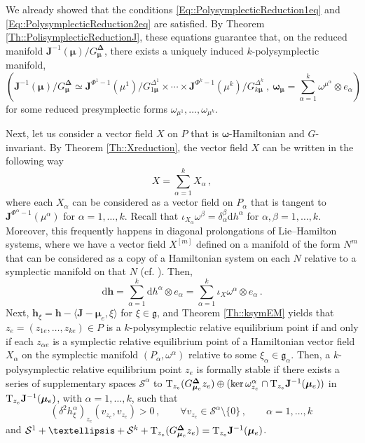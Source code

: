 \documentclass[11pt]{article}
\theoremstyle{plain}
\theoremstyle{definition}
\newcommand{\T}{\mathrm{T}}
\newcommand{\bomega}{{\boldsymbol{\omega}}}
\renewcommand{\d}{\mathrm{d}}
\newcommand{\x}{\times}
\def\d{\mathrm{d}}
\numberwithin{equation}{section}
\begin{document}
We already showed that the conditions \eqref{Eq::PolysymplecticReduction1eq}  and \eqref{Eq::PolysymplecticReduction2eq} are satisfied. By Theorem \ref{Th::PolisymplecticReductionJ}, these equations guarantee that, on the reduced manifold $\mathbf{J}^{-1}(\bm\mu)/G^{\bm\Delta}_{\bm\mu}$, there exists a uniquely induced $k$-polysymplectic manifold, 
\[
 \left(\mathbf{J}^{-1}(\bm\mu)/G^{\bm\Delta}_{\bm\mu}\simeq \mathbf{J}^{\Phi^1-1}(\mu^1)/G^{\Delta^1}_{1\bm\mu}\x\dotsb\x \mathbf{J}^{\Phi^k-1}(\mu^k)/G^{\Delta^k}_{k\bm \mu}\ ,\ 
\bm{\omega}_{\bm\mu}=\sum_{\alpha=1}^k\omega^{\mu^\alpha}\otimes e_\alpha\right)
\]
for some reduced presymplectic forms $\omega_{\mu^1},\ldots,\omega_{\mu^k}$.


Next, let us consider a vector field $X$ on $P$ that is $\bomega$-Hamiltonian and $G$-invariant. By Theorem \ref{Th::Xreduction}, the vector field $X$ can be written in the following way
\[
X=\sum^k_{\alpha=1}X_\alpha\,,
\]
where each $X_\alpha$ can be considered as a vector field on $P_\alpha$ that is tangent to $\mathbf{J}^{\Phi^\alpha-1}(\mu^\alpha)$ for $\alpha=1,\ldots, k$. Recall that $\iota_{X_\alpha}\omega^\beta =\delta_\alpha^\beta \d h^\alpha$ for $\alpha,\beta=1,\ldots,k$. Moreover, this frequently happens in diagonal prolongations of Lie--Hamilton systems, where we have a vector field $X^{[m]}$ defined on a manifold of the form $N^m$ that can be considered as a copy of a Hamiltonian system on each $N$ relative to a symplectic manifold on that $N$ (cf. \cite{LS_20}). Then,
\[
    \d\boldsymbol{h}=\sum^k_{\alpha=1}\d h^\alpha\otimes e_\alpha=\sum^k_{\alpha=1}\iota_{X}\omega^\alpha\otimes e_\alpha\,.
\]
Next, $\bm h_\xi=\bm h-\langle \mathbf{J}-\bm{\mu}_e,\xi\rangle$ for $\xi\in \mathfrak{g}$, and Theorem \ref{Th::ksymEM} yields that $z_e=(z_{1e},\dots,z_{ke})\in P$ is a $k$-polysymplectic relative equilibrium point if and only if each $z_{\alpha e}$ is a symplectic relative equilibrium point of a Hamiltonian vector field $X_\alpha$ on the symplectic manifold $(P_\alpha,\omega^\alpha)$ relative to some $\xi_\alpha\in \mathfrak{g}_\alpha$. %
Then, a $k$-polysymplectic relative equilibrium point $z_e$ is formally stable if there exists a series of supplementary spaces $\mathcal{S}^\alpha$ to $\T_{z_e}(G^{\bm\Delta}_{\bm \mu_e}z_e)\oplus (\ker \omega^\alpha_{z_e}\cap \T_{z_e}{\bf J}^{-1}(\bm\mu_e))$ in $\T_{z_e}{\bf J}^{-1}(\bm\mu_e)$, with $\alpha=1,\ldots,k$, such that
\begin{equation}
    \label{Eq::ExProductSym}
\left(\delta^2  h^\alpha_\xi\right)_{z_e}(v_{z_e},v_{z_e})>0\,,\qquad \forall v_{z_e}\in \mathcal{S}^\alpha\setminus\{0\}\,,\qquad \alpha=1,\ldots,k\,
\end{equation}
and $\mathcal{S}^1+\ldots+\mathcal{S}^k+\T_{z_e}(G^{\bm\Delta}_{\bm \mu_e}z_e)=\T_{z_e}{\bf J}^{-1}(\bm\mu_e)$.
\end{document}
